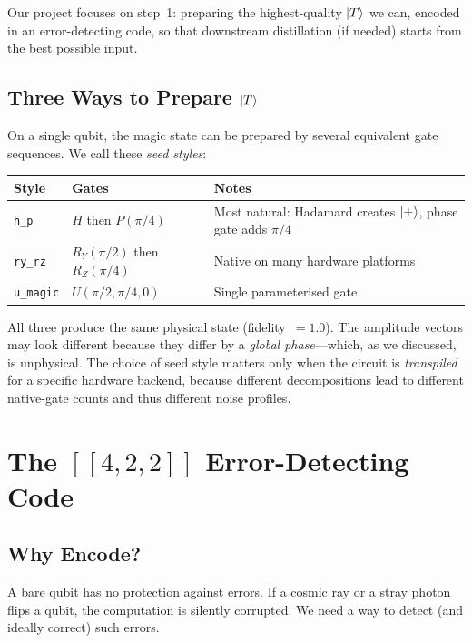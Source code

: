 \documentclass[11pt,a4paper,twoside]{report}
\theoremstyle{definition}
\newcommand{\code}[1]{\texttt{#1}}
\newcommand{\ketT}{\ket{T}}
\begin{document}
Our project focuses on step~1: preparing the highest-quality $\ketT$
we can, encoded in an error-detecting code, so that downstream
distillation (if needed) starts from the best possible input.

\section{Three Ways to Prepare $\ketT$}
\label{sec:seeds}

On a single qubit, the magic state can be prepared by several
equivalent gate sequences. We call these \emph{seed styles}:

\begin{center}
\renewcommand{\arraystretch}{1.3}
\begin{tabular}{lll}
\toprule
\textbf{Style} & \textbf{Gates} & \textbf{Notes} \\
\midrule
\code{h\_p} & $H$ then $P(\pi/4)$ &
  Most natural: Hadamard creates $\ket{+}$, phase gate adds $\pi/4$ \\
\code{ry\_rz} & $R_Y(\pi/2)$ then $R_Z(\pi/4)$ &
  Native on many hardware platforms \\
\code{u\_magic} & $U(\pi/2, \pi/4, 0)$ &
  Single parameterised gate \\
\bottomrule
\end{tabular}
\end{center}

All three produce the same physical state (fidelity~$= 1.0$). The
amplitude vectors may look different because they differ by a
\emph{global phase}---which, as we discussed, is unphysical. The choice
of seed style matters only when the circuit is \emph{transpiled} for a
specific hardware backend, because different decompositions lead to
different native-gate counts and thus different noise profiles.

\chapter{The $[\![4,2,2]\!]$ Error-Detecting Code}
\label{ch:code}

\section{Why Encode?}

A bare qubit has no protection against errors. If a cosmic ray or a
stray photon flips a qubit, the computation is silently corrupted. We
need a way to detect (and ideally correct) such errors.
\end{document}
